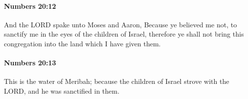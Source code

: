 		\paragraph{Numbers 20:12} %
			\label{NUMBERS-20-12}

			And the LORD spake unto Moses and Aaron, Because ye believed me not, to sanctify me in the eyes of the children of Israel, therefore ye shall not bring this congregation into the land which I have given them.


		\paragraph{Numbers 20:13} %
			\label{NUMBERS-20-13}

			This is the water of Meribah; because the children of Israel strove with the LORD, and he was sanctified in them.


